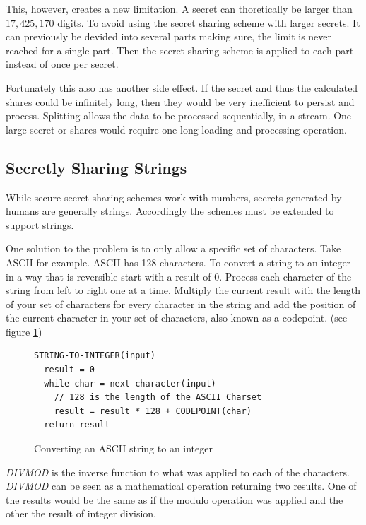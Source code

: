 This, however, creates a new limitation. A secret can thoretically be larger
than $17,425,170$ digits. To avoid using the secret sharing scheme with larger
secrets. It can previously be devided into several parts making sure, the limit
is never reached for a single part. Then the secret sharing scheme is applied to
each part instead of once per secret.

Fortunately this also has another side effect. If the secret and thus the
calculated shares could be infinitely long, then they would be very inefficient
to persist and process. Splitting allows the data to be processed sequentially,
in a stream. One large secret or shares would require one long loading and
processing operation.

\subsection{Secretly Sharing Strings}

While secure secret sharing schemes work with numbers, secrets generated by
humans are generally strings. Accordingly the schemes must be extended to
support strings.

One solution to the problem is to only allow a specific set of characters. Take
ASCII for example. ASCII has 128 characters. To convert a string to an integer
in a way that is reversible start with a result of 0. Process each character of
the string from left to right one at a time. Multiply the current result with
the length of your set of characters for every character in the string and add
the position of the current character in your set of characters, also known as
a codepoint. (see figure \ref{code:stringToInteger})

\begin{figure}
\begin{lstlisting}
STRING-TO-INTEGER(input)
  result = 0
  while char = next-character(input)
    // 128 is the length of the ASCII Charset
    result = result * 128 + CODEPOINT(char)
  return result
\end{lstlisting}
\caption{Converting an ASCII string to an integer}
\label{code:stringToInteger}
\end{figure}

\textit{DIVMOD} is the inverse function to what was applied to each of the
characters. \textit{DIVMOD} can be seen as a mathematical operation returning
two results. One of the results would be the same as if the modulo operation
was applied and the other the result of integer division.

